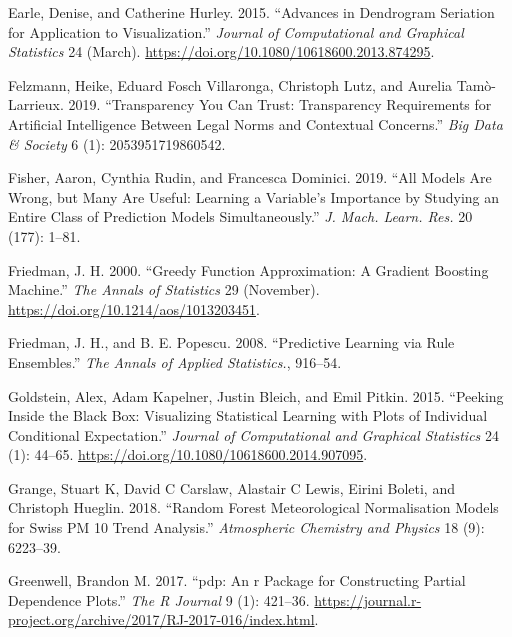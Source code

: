 \begin{CSLReferences}{1}{0}
\leavevmode{}%
Earle, Denise, and Catherine Hurley. 2015. {``Advances in Dendrogram Seriation for Application to Visualization.''} \emph{Journal of Computational and Graphical Statistics} 24 (March). \url{https://doi.org/10.1080/10618600.2013.874295}.

\leavevmode{}%
Felzmann, Heike, Eduard Fosch Villaronga, Christoph Lutz, and Aurelia Tamò-Larrieux. 2019. {``Transparency You Can Trust: Transparency Requirements for Artificial Intelligence Between Legal Norms and Contextual Concerns.''} \emph{Big Data \& Society} 6 (1): 2053951719860542.

\leavevmode{}%
Fisher, Aaron, Cynthia Rudin, and Francesca Dominici. 2019. {``All Models Are Wrong, but Many Are Useful: Learning a Variable's Importance by Studying an Entire Class of Prediction Models Simultaneously.''} \emph{J. Mach. Learn. Res.} 20 (177): 1--81.

\leavevmode{}%
Friedman, J. H. 2000. {``Greedy Function Approximation: A Gradient Boosting Machine.''} \emph{The Annals of Statistics} 29 (November). \url{https://doi.org/10.1214/aos/1013203451}.

\leavevmode{}%
Friedman, J. H., and B. E. Popescu. 2008. {``Predictive Learning via Rule Ensembles.''} \emph{The Annals of Applied Statistics.}, 916--54.

\leavevmode{}%
Goldstein, Alex, Adam Kapelner, Justin Bleich, and Emil Pitkin. 2015. {``Peeking Inside the Black Box: Visualizing Statistical Learning with Plots of Individual Conditional Expectation.''} \emph{Journal of Computational and Graphical Statistics} 24 (1): 44--65. \url{https://doi.org/10.1080/10618600.2014.907095}.

\leavevmode{}%
Grange, Stuart K, David C Carslaw, Alastair C Lewis, Eirini Boleti, and Christoph Hueglin. 2018. {``Random Forest Meteorological Normalisation Models for Swiss PM 10 Trend Analysis.''} \emph{Atmospheric Chemistry and Physics} 18 (9): 6223--39.

\leavevmode{}%
Greenwell, Brandon M. 2017. {``{pdp}: An r Package for Constructing Partial Dependence Plots.''} \emph{The R Journal} 9 (1): 421--36. \url{https://journal.r-project.org/archive/2017/RJ-2017-016/index.html}.


\end{CSLReferences}
